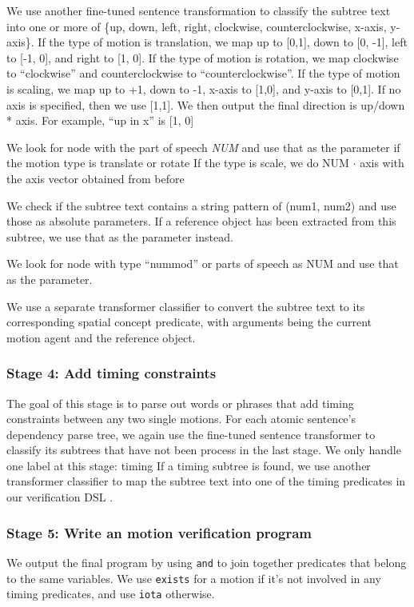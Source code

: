 \begin{description}[style=unboxed,leftmargin=0.5cm]
    \item[\texttt{direction()}]
    We use another fine-tuned sentence transformation to classify the subtree text into one or more of \{up, down, left, right, clockwise, counterclockwise, x-axis, y-axis\}.
    If the type of motion is translation, we map up to [0,1], down to [0, -1], left to [-1, 0], and right to [1, 0].
    If the type of motion is rotation, we map clockwise to ``clockwise'' and counterclockwise to ``counterclockwise''.
    If the type of motion is scaling, we map up to +1, down to -1, x-axis to [1,0], and y-axis to [0,1]. If no axis is specified, then we use [1,1]. We then output the final direction is up/down * axis. For example, ``up in x'' is [1, 0]
    
    \item[\texttt{magnitude()}]
    We look for node with the part of speech \textit{NUM} and use that as the parameter if the motion type is translate or rotate
    If the type is scale, we do NUM $\cdot$ axis with the axis vector obtained from before
    
    \item[\texttt{origin()}]
    We check if the subtree text contains a string pattern of (num1, num2) and use those as absolute parameters.
    If a reference object has been extracted from this subtree, we use that as the parameter instead.
    
    \item[\texttt{duration()}]
    We look for node with type “nummod” or parts of speech as NUM and use that as the parameter.
    
    \item[\texttt{post()}]
    We use a separate transformer classifier to convert the subtree text to its corresponding spatial concept predicate, with arguments being the current motion agent and the reference object.
\end{description}

\subsubsection{Stage 4: Add timing constraints}
The goal of this stage is to parse out words or phrases that add timing constraints between any two single motions.
For each atomic sentence’s dependency parse tree, we again use the fine-tuned sentence transformer to classify its subtrees that have not been process in the last stage. 
We only handle one label at this stage: timing
If a timing subtree is found, we use another transformer classifier to map the subtree text into one of the timing predicates in our verification DSL .

\subsubsection{Stage 5: Write an motion verification program}
We output the final program by using \texttt{and} to join together predicates that belong to the same variables.
We use \texttt{exists} for a motion if it’s not involved in any timing predicates, and use \texttt{iota} otherwise.
